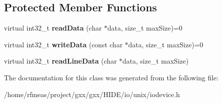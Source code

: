 \subsection*{Protected Member Functions}
\begin{DoxyCompactItemize}
\item 
virtual int32\+\_\+t {\bfseries read\+Data} (char $\ast$data, size\+\_\+t max\+Size)=0\hypertarget{classgxx_1_1unix_1_1IODevice_a606d0d0e34aa943b107a5d7e8ef4ab49}{}\label{classgxx_1_1unix_1_1IODevice_a606d0d0e34aa943b107a5d7e8ef4ab49}

\item 
virtual int32\+\_\+t {\bfseries write\+Data} (const char $\ast$data, size\+\_\+t max\+Size)=0\hypertarget{classgxx_1_1unix_1_1IODevice_a68b31617822ee80fbb35d7a05cd75374}{}\label{classgxx_1_1unix_1_1IODevice_a68b31617822ee80fbb35d7a05cd75374}

\item 
virtual int32\+\_\+t {\bfseries read\+Line\+Data} (char $\ast$data, size\+\_\+t max\+Size)\hypertarget{classgxx_1_1unix_1_1IODevice_ae63b54ae4608c9b5f2bad697f89e434e}{}\label{classgxx_1_1unix_1_1IODevice_ae63b54ae4608c9b5f2bad697f89e434e}

\end{DoxyCompactItemize}


The documentation for this class was generated from the following file\+:\begin{DoxyCompactItemize}
\item 
/home/rfmeas/project/gxx/gxx/\+H\+I\+D\+E/io/unix/iodevice.\+h\end{DoxyCompactItemize}
